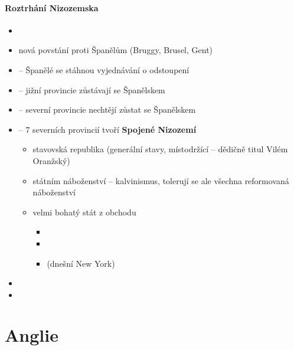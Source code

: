 \paragraph{Roztrhání Nizozemska}
\begin{itemize}
\item {}
\item nová povstání proti Španělům (Bruggy, Brusel, Gent)
\item {} -- Španělé se stáhnou \ra vyjednávání o odstoupení
\item {} -- jižní provincie zůstávají se Španělskem
\item {} -- severní provincie nechtějí zůstat se Španělskem
\item {} -- 7 severních provincií tvoří \textbf{Spojené Nizozemí}
	\begin{itemize}
	\item stavovská republika (generální stavy, místodržící -- dědičně titul Vilém Oranžský)
	\item státním náboženství -- kalvinismus, tolerují se ale všechna reformovaná náboženství
	\item velmi bohatý stát z obchodu
		\begin{itemize}
		\item {}
		\item {}
		\item {}(dnešní New York)
		\end{itemize}
	\end{itemize}
\item {}
\item {}
\end{itemize}

\section{Anglie}
